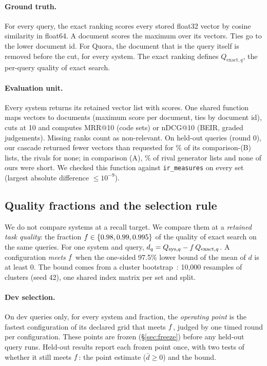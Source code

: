 \paragraph{Ground truth.} For every query, the exact ranking scores every stored float32 vector by
cosine similarity in float64. A document scores the maximum over its vectors. Ties go to the lower
document id. For Quora, the document that is the query itself is removed before the cut, for every
system. The exact ranking defines $Q_{\text{exact},q}$, the per-query quality of exact search.

\paragraph{Evaluation unit.} Every system returns its retained vector list with scores. One shared
function maps vectors to documents (maximum score per document, ties by document id), cuts at 10 and
computes MRR@10 (code sets) or nDCG@10 (BEIR, graded judgements). Missing ranks count as
non-relevant. On held-out queries (round 0), our cascade returned fewer vectors than requested for
\% of its comparison-(B) lists, the rivals for none; in comparison (A), \%
of rival generator lists and none of ours were short. We checked this function against
\texttt{ir\_measures} on every set (largest absolute difference $\le 10^{-9}$).

\subsection{Quality fractions and the selection rule}

We do not compare systems at a recall target. We compare them at a \emph{retained task quality}: the
fraction $f \in \{0.98, 0.99, 0.995\}$ of the quality of exact search on the same queries. For one
system and query, $d_q = Q_{\text{sys},q} - f\, Q_{\text{exact},q}$. A configuration
\emph{meets} $f$ when the one-sided 97.5\% lower bound of the mean of $d$ is at least 0. The bound
comes from a cluster bootstrap~\cite{efron1993bootstrap,sakai2006bootstrap}: 10,000 resamples of
clusters (seed 42), one shared index matrix per set and split.

\paragraph{Dev selection.} On dev queries only, for every system and fraction, the \emph{operating
point} is the fastest configuration of its declared grid that meets $f$, judged by one timed round per
configuration. These points are frozen
(\S\ref{sec:freeze}) before any held-out query runs. Held-out results report each frozen point once,
with two tests of whether it still meets $f$: the point estimate ($\bar d \ge 0$) and the bound.

